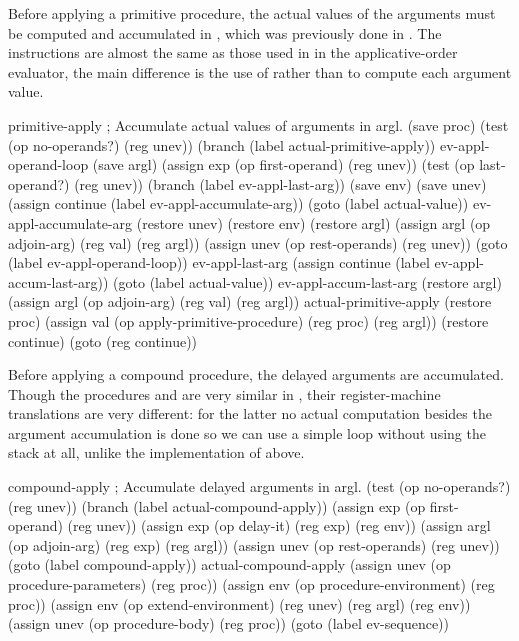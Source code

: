 \begin{exe}[5.25]
    Before applying a primitive procedure, the actual values of the arguments 
    must be computed and accumulated in , which was previously done 
    in . The instructions are almost the same as those used 
    in  in the applicative-order evaluator, the main 
    difference is the use of  rather than 
     to compute each argument value.
    \begin{cscm}
    primitive-apply
        ; Accumulate actual values of arguments in argl.
        (save proc)
        (test (op no-operands?) (reg unev))
        (branch (label actual-primitive-apply))
    ev-appl-operand-loop
        (save argl)
        (assign exp (op first-operand) (reg unev))
        (test (op last-operand?) (reg unev))
        (branch (label ev-appl-last-arg))
        (save env)
        (save unev)
        (assign continue (label ev-appl-accumulate-arg))
        (goto (label actual-value))
    ev-appl-accumulate-arg
        (restore unev)
        (restore env)
        (restore argl)
        (assign argl (op adjoin-arg) (reg val) (reg argl))
        (assign unev (op rest-operands) (reg unev))
        (goto (label ev-appl-operand-loop))
    ev-appl-last-arg
        (assign continue (label ev-appl-accum-last-arg))
        (goto (label actual-value))
    ev-appl-accum-last-arg
        (restore argl)
        (assign argl (op adjoin-arg) (reg val) (reg argl))
    actual-primitive-apply
        (restore proc)
        (assign val (op apply-primitive-procedure) (reg proc) (reg argl))
        (restore continue)
        (goto (reg continue))
    \end{cscm}

    Before applying a compound procedure, the delayed arguments are accumulated. 
    Though the procedures  and 
     are very similar in 
    , their register-machine translations 
    are very different: for the latter no actual computation besides the 
    argument accumulation is done so we can use a simple loop without using the 
    stack at all, unlike the implementation of  above.
    \begin{cscm}
    compound-apply
        ; Accumulate delayed arguments in argl.
        (test (op no-operands?) (reg unev))
        (branch (label actual-compound-apply))
        (assign exp (op first-operand) (reg unev))
        (assign exp (op delay-it) (reg exp) (reg env))
        (assign argl (op adjoin-arg) (reg exp) (reg argl))
        (assign unev (op rest-operands) (reg unev))
        (goto (label compound-apply))
    actual-compound-apply
        (assign unev (op procedure-parameters) (reg proc))
        (assign env (op procedure-environment) (reg proc))
        (assign env (op extend-environment) (reg unev) (reg argl) (reg env))
        (assign unev (op procedure-body) (reg proc))
        (goto (label ev-sequence))
    \end{cscm}
\end{exe}

